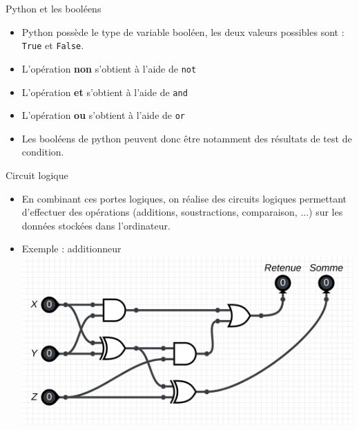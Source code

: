 \documentclass[10pt]{beamer}
\begin{document}
\begin{frame}
	\mframe{\Arch}
	\begin{block}{Python et les booléens}
		\begin{itemize}[label=\textbullet]
			\item<1-> Python possède le type de variable booléen, les deux valeurs possibles sont : \texttt{True} et \texttt{False}.
			\item<2-> L'opération \textbf{non} s'obtient à l'aide de \texttt{not}
			\item<3-> L'opération \textbf{et} s'obtient à l'aide de \texttt{and}
			\item<4-> L'opération \textbf{ou} s'obtient à l'aide de \texttt{or}
			\item<5-> Les booléens de python peuvent donc être notamment des résultats de test de condition.
		\end{itemize}
	\end{block}
\end{frame}

\begin{frame}
	\mframe{\Arch}
	\begin{alertblock}{Circuit logique}
		\begin{itemize}[label=\textbullet]
			\item<1-> En combinant ces portes logiques, on réalise des circuits 
			logiques permettant d'effectuer des opérations (additions, 
			soustractions, comparaison, ...) sur les données stockées dans 
			l'ordinateur.
			\item<2-> Exemple : additionneur
			\includegraphics[scale=0.15]{../../T01_TypesBase/T1.4_Booleens/portes_logiques/additionneur3.png}
		\end{itemize}
	\end{alertblock}
\end{frame}
\end{document}
